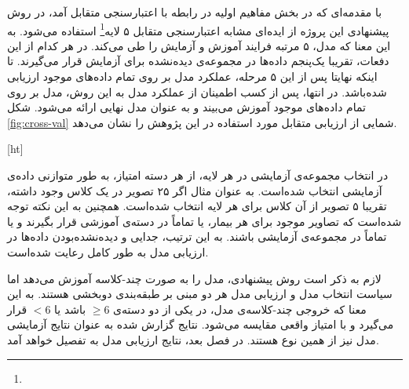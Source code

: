
با مقدمه‌ای که در بخش مفاهیم اولیه در رابطه با اعتبارسنجی متقابل آمد، در روش پیشنهادی این پروژه از ایده‌ای مشابه 
اعتبارسنجی متقابل ۵ لایه\footnote{}
استفاده می‌شود.
به این معنا که مدل، ۵ مرتبه فرایند آموزش و آزمایش را طی می‌کند.
 در هر کدام از این دفعات، تقریبا یک‌پنجم داده‌ها در مجموعه‌ی دیده‌نشده برای آزمایش قرار می‌گیرند.
 تا اینکه نهایتا پس از این ۵ مرحله، عملکرد مدل بر روی تمام داده‌های موجود ارزیابی شده‌باشد.
 در انتها، پس از کسب اطمینان از عملکرد مدل به این روش، مدل بر روی تمام داده‌های موجود آموزش می‌بیند و به عنوان مدل نهایی ارائه می‌شود.
 شکل \ref{fig:cross-val}
 شمایی از ارزیابی متقابل مورد استفاده در این پژوهش را نشان می‌دهد.

[ht]
\vspace{0.5cm}


\vspace{0.5cm}

در انتخاب مجموعه‌ی آزمایشی در هر لایه، از هر دسته امتیاز، به طور متوازنی داده‌ی آزمایشی انتخاب شده‌است.
به عنوان مثال اگر ۲۵ تصویر در یک کلاس وجود داشته، تقریبا ۵ تصویر از آن کلاس برای هر لایه انتخاب شده‌است.
همچنین به این نکته توجه شده‌است که تصاویر موجود برای هر بیمار، یا تماماً در دسته‌ی آموزشی قرار بگیرند و یا تماماً در مجموعه‌ی آزمایشی باشند.
به این ترتیب، جدایی و  دیده‌نشده‌بودن داده‌ها در ارزیابی مدل به طور کامل رعایت شده‌است.

لازم به ذکر است
روش پیشنهادی، مدل را به صورت چند-کلاسه آموزش می‌دهد اما سیاست انتخاب مدل و ارزیابی مدل هر دو مبنی بر طبقه‌بندی دو‌بخشی هستند.
به این معنا که خروجی چند-کلاسه‌ی مدل، 
در یکی از دو دسته‌ی 
$\geq 6$ باشد یا $< 6$
قرار می‌گیرد و با امتیاز واقعی مقایسه می‌شود.
نتایج گزارش شده به عنوان نتایج آزمایشی مدل نیز از همین نوع هستند. 
در فصل بعد، نتایج ارزیابی مدل به تفصیل خواهد آمد.
